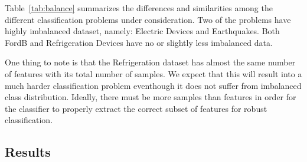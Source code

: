 \documentclass{juliacon}
\begin{document}
\vskip 6pt

\begin{table}
\label{tab:balance}
\end{table}

Table~\ref{tab:balance} summarizes the differences and similarities among the different classification problems under consideration. Two of the problems have highly imbalanced dataset, namely: Electric Devices and Earthquakes. Both FordB and Refrigeration Devices have no or slightly less imbalanced data. 

\vskip 6pt

One thing to note is that the Refrigeration dataset has almost the same number of features with its total number of samples. We expect that this will result into a much harder classification problem eventhough it does not suffer from imbalanced class distribution. Ideally, there must be more samples than features in order for the classifier to properly extract the correct subset of features for robust classification.


\subsection{Results}

\begin{table}
\label{tab:elec}
\end{table}
\end{document}
